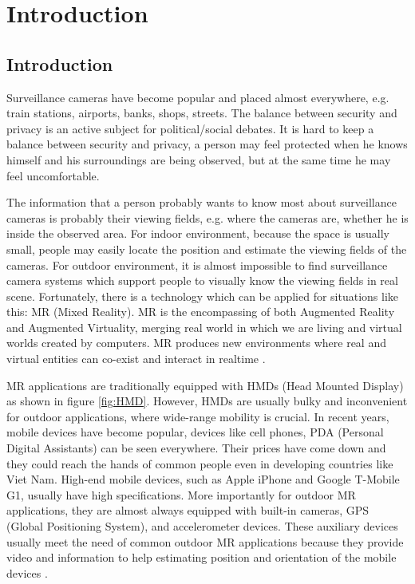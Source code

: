 \chapter{Introduction} %
\label{Chapter1}


\section{Introduction}

Surveillance cameras have become popular and placed almost everywhere, e.g. train stations, airports, banks, shops, streets. The balance between security and privacy is an active subject for political/social debates. It is hard to keep a balance between security and privacy, a person may feel protected when he knows himself and his surroundings are being observed, but at the same time he may feel uncomfortable.

The information that a person probably wants to know most about surveillance cameras is probably their viewing fields, e.g. where the cameras are, whether he is inside the observed area. For indoor environment, because the space is usually small, people may easily locate the position and estimate the viewing fields of the cameras. For outdoor environment, it is almost impossible to find surveillance camera systems which support people to visually know the viewing fields in real scene. Fortunately, there is a technology which can be applied for situations like this: MR (Mixed Reality). MR is the encompassing of both Augmented Reality and Augmented Virtuality, merging real world in which we are living and virtual worlds created by computers. MR produces new environments where real and virtual entities can co-exist and interact in realtime \citep{Reference3}.

MR applications are traditionally equipped with HMDs (Head Mounted Display) as shown in figure \ref{fig:HMD}. However, HMDs are usually bulky and inconvenient for outdoor applications, where wide-range mobility is crucial. In recent years, mobile devices have become popular, devices like cell phones, PDA (Personal Digital Assistants) can be seen everywhere. Their prices have come down and they could reach the hands of common people even in developing countries like Viet Nam. High-end mobile devices, such as Apple iPhone and Google T-Mobile G1, usually have high specifications. More importantly for outdoor MR applications, they are almost always equipped with built-in cameras, GPS (Global Positioning System), and accelerometer devices. These auxiliary devices usually meet the need of common outdoor MR applications because they provide video and information to help estimating position and orientation of the mobile devices \citep{Reference2} \citep{Reference4}.

